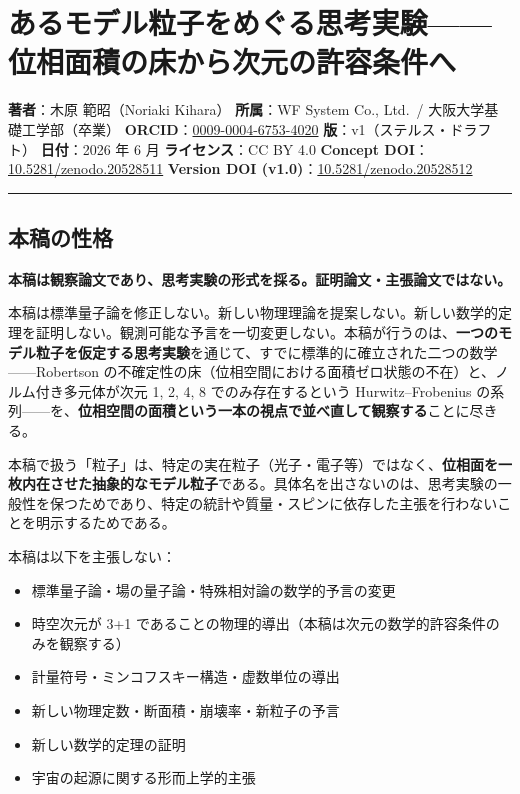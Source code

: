 \documentclass[
]{ltjsarticle}
\author{}
\date{}
\providecommand{\tightlist}{%
  \setlength{\itemsep}{0pt}\setlength{\parskip}{0pt}}
\begin{document}
\section{あるモデル粒子をめぐる思考実験------位相面積の床から次元の許容条件へ}\label{ux3042ux308bux30e2ux30c7ux30ebux7c92ux5b50ux3092ux3081ux3050ux308bux601dux8003ux5b9fux9a13ux4f4dux76f8ux9762ux7a4dux306eux5e8aux304bux3089ux6b21ux5143ux306eux8a31ux5bb9ux6761ux4ef6ux3078}

\textbf{著者}：木原 範昭（Noriaki Kihara） \textbf{所属}：WF System Co.,
Ltd.~/ 大阪大学基礎工学部（卒業）
\textbf{ORCID}：\href{https://orcid.org/0009-0004-6753-4020}{0009-0004-6753-4020}
\textbf{版}：v1（ステルス・ドラフト） \textbf{日付}：2026 年 6 月
\textbf{ライセンス}：CC BY 4.0 \textbf{Concept
DOI}：\href{https://doi.org/10.5281/zenodo.20528511}{10.5281/zenodo.20528511}
\textbf{Version DOI
(v1.0)}：\href{https://doi.org/10.5281/zenodo.20528512}{10.5281/zenodo.20528512}

\begin{center}\rule{0.5\linewidth}{0.5pt}\end{center}

\subsection{本稿の性格}\label{ux672cux7a3fux306eux6027ux683c}

\textbf{本稿は観察論文であり、思考実験の形式を採る。証明論文・主張論文ではない。}

本稿は標準量子論を修正しない。新しい物理理論を提案しない。新しい数学的定理を証明しない。観測可能な予言を一切変更しない。本稿が行うのは、\textbf{一つのモデル粒子を仮定する思考実験}を通じて、すでに標準的に確立された二つの数学------Robertson
の不確定性の床（位相空間における面積ゼロ状態の不在）と、ノルム付き多元体が次元
1, 2, 4, 8 でのみ存在するという Hurwitz--Frobenius
の系列------を、\textbf{位相空間の面積という一本の視点で並べ直して観察する}ことに尽きる。

本稿で扱う「粒子」は、特定の実在粒子（光子・電子等）ではなく、\textbf{位相面を一枚内在させた抽象的なモデル粒子}である。具体名を出さないのは、思考実験の一般性を保つためであり、特定の統計や質量・スピンに依存した主張を行わないことを明示するためである。

本稿は以下を主張しない：

\begin{itemize}
\tightlist
\item
  標準量子論・場の量子論・特殊相対論の数学的予言の変更
\item
  時空次元が 3+1
  であることの物理的導出（本稿は次元の数学的許容条件のみを観察する）
\item
  計量符号・ミンコフスキー構造・虚数単位の導出
\item
  新しい物理定数・断面積・崩壊率・新粒子の予言
\item
  新しい数学的定理の証明
\item
  宇宙の起源に関する形而上学的主張
\end{itemize}
\end{document}
